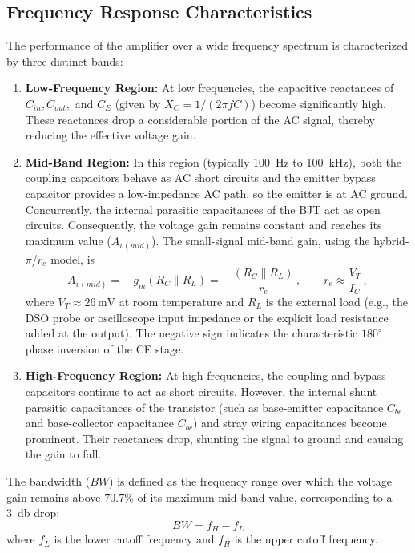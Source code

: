 \subsection{Frequency Response Characteristics}
The performance of the amplifier over a wide frequency spectrum is characterized by three distinct bands:
\begin{enumerate}
	\item \textbf{Low-Frequency Region:} At low frequencies, the capacitive reactances of $C_{in}, C_{out},$ and $C_E$ (given by $X_C = 1 / (2\pi fC)$) become significantly high. These reactances drop a considerable portion of the AC signal, thereby reducing the effective voltage gain.
	
	\item \textbf{Mid-Band Region:} In this region (typically \SI{100}{\hertz} to \SI{100}{\kilo\hertz}), both the coupling capacitors behave as AC short circuits and the emitter bypass capacitor provides a low-impedance AC path, so the emitter is at AC ground. Concurrently, the internal parasitic capacitances of the BJT act as open circuits. Consequently, the voltage gain remains constant and reaches its maximum value ($A_{v(mid)}$).
	The small-signal mid-band gain, using the hybrid-$\pi$/$r_e$ model, is
	\begin{equation}
		A_{v(mid)} = -\,g_m (R_C \parallel R_L) = -\,\frac{(R_C \parallel R_L)}{r_e}\,, \qquad r_e \approx \frac{V_T}{I_C}\,,
		\label{eq:av_mid}
	\end{equation}
	where $V_T \approx 26\,\text{mV}$ at room temperature and $R_L$ is the external load (e.g., the DSO probe or oscilloscope input impedance or the explicit load resistance added at the output). The negative sign indicates the characteristic $180^\circ$ phase inversion of the CE stage.
	
	\item \textbf{High-Frequency Region:} At high frequencies, the coupling and bypass capacitors continue to act as short circuits. However, the internal shunt parasitic capacitances of the transistor (such as base-emitter capacitance $C_{be}$ and base-collector capacitance $C_{bc}$) and stray wiring capacitances become prominent. Their reactances drop, shunting the signal to ground and causing the gain to fall.
\end{enumerate}

The bandwidth ($BW$) is defined as the frequency range over which the voltage gain remains above $70.7\%$ of its maximum mid-band value, corresponding to a \SI{3}{\decibel} drop:
\begin{equation}
	BW = f_H - f_L
\end{equation}
where $f_L$ is the lower cutoff frequency and $f_H$ is the upper cutoff frequency.

